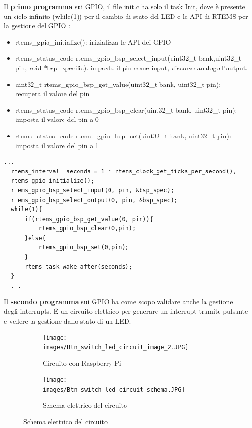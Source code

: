 \documentclass[12pt, a4paper, titlepage, oneside]{book}
\begin{document}
Il \textbf{primo programma} sui GPIO, il file init.c ha solo il task Init, dove è presente un ciclo infinito (while(1)) per il cambio di stato del LED e le API di RTEMS per la gestione del GPIO :
\begin{itemize}
    \item\parbox[t]{\linewidth}{rtems\_gpio\_initialize(): inizializza le API dei GPIO}
    \item\parbox[t]{\linewidth}{rtems\_status\_code rtems\_gpio\_bsp\_select\_input(uint32\_t bank,uint32\_t pin,  void *bsp\_specific): imposta il pin come input, discorso analogo l'output.}
    \item\parbox[t]{\linewidth}{uint32\_t rtems\_gpio\_bsp\_get\_value(uint32\_t bank, uint32\_t pin): recupera il valore del pin}
    \item\parbox[t]{\linewidth}{rtems\_status\_code rtems\_gpio\_bsp\_clear(uint32\_t bank, uint32\_t pin): imposta il valore del pin a 0}
    \item\parbox[t]{\linewidth}{rtems\_status\_code rtems\_gpio\_bsp\_set(uint32\_t bank, uint32\_t pin): imposta il valore del pin a 1}
\end{itemize}
\begin{lstlisting}[style = CStyle]
  ...
  rtems_interval  seconds = 1 * rtems_clock_get_ticks_per_second();
  rtems_gpio_initialize();
  rtems_gpio_bsp_select_input(0, pin, &bsp_spec);
  rtems_gpio_bsp_select_output(0, pin, &bsp_spec);
  while(1){
	  if(rtems_gpio_bsp_get_value(0, pin)){
		  rtems_gpio_bsp_clear(0,pin);
	  }else{
		  rtems_gpio_bsp_set(0,pin);
	  }
	  rtems_task_wake_after(seconds);
  }
  ...
\end{lstlisting}
\newpage
Il \textbf{secondo programma} sui GPIO ha come scopo validare anche la gestione degli interrupts. 
È un circuito elettrico per generare un interrupt tramite pulsante e vedere la gestione dallo stato di un LED.\newline
\begin{figure}[h]
\begin{subfigure}{0.5\textwidth}
\texttt{[image: images/Btn\_switch\_led\_circuit\_image\_2.JPG]}
\caption{Circuito con Raspberry Pi}
\label{fig:Circuito con Raspberry Pi}
\end{subfigure}
\begin{subfigure}{0.5\textwidth}
\texttt{[image: images/Btn\_switch\_led\_circuit\_schema.JPG]}
\caption{Schema elettrico del circuito}
\label{fig:Schema elettrico del circuito}
\end{subfigure}
\end{figure}
\end{document}
